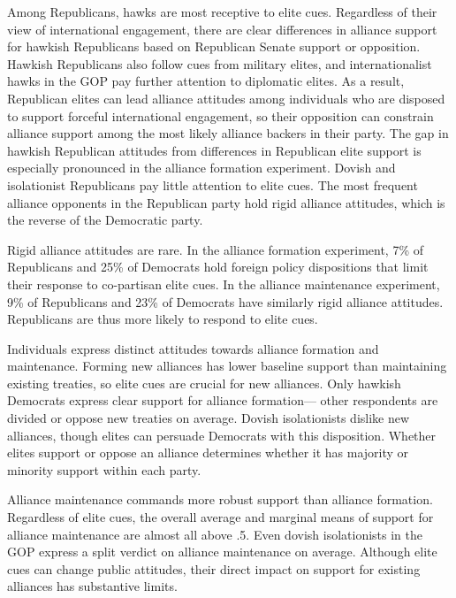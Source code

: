\documentclass[12pt]{article}
\begin{document}
Among Republicans, hawks are most receptive to elite cues. 
Regardless of their view of international engagement, there are clear differences in alliance support for hawkish Republicans based on Republican Senate support or opposition.
Hawkish Republicans also follow cues from military elites, and internationalist hawks in the GOP pay further attention to diplomatic elites. 
As a result, Republican elites can lead alliance attitudes among individuals who are disposed to support forceful international engagement, so their opposition can constrain alliance support among the most likely alliance backers in their party. 
The gap in hawkish Republican attitudes from differences in Republican elite support is especially pronounced in the alliance formation experiment. 
Dovish and isolationist Republicans pay little attention to elite cues. 
The most frequent alliance opponents in the Republican party hold rigid alliance attitudes, which is the reverse of the Democratic party. 


Rigid alliance attitudes are rare. 
In the alliance formation experiment, 7\% of Republicans and 25\% of Democrats hold foreign policy dispositions that limit their response to co-partisan elite cues. 
In the alliance maintenance experiment, 9\% of Republicans and 23\% of Democrats have similarly rigid alliance attitudes.
Republicans are thus more likely to respond to elite cues.


Individuals express distinct attitudes towards alliance formation and maintenance. 
Forming new alliances has lower baseline support than maintaining existing treaties, so elite cues are crucial for new alliances. 
Only hawkish Democrats express clear support for alliance formation--- other respondents are divided or oppose new treaties on average.
Dovish isolationists dislike new alliances, though elites can persuade Democrats with this disposition. 
Whether elites support or oppose an alliance determines whether it has majority or minority support within each party. 


Alliance maintenance commands more robust support than alliance formation. 
Regardless of elite cues, the overall average and marginal means of support for alliance maintenance are almost all above .5. 
Even dovish isolationists in the GOP express a split verdict on alliance maintenance on average.
Although elite cues can change public attitudes, their direct impact on support for existing alliances has substantive limits.
\end{document}
